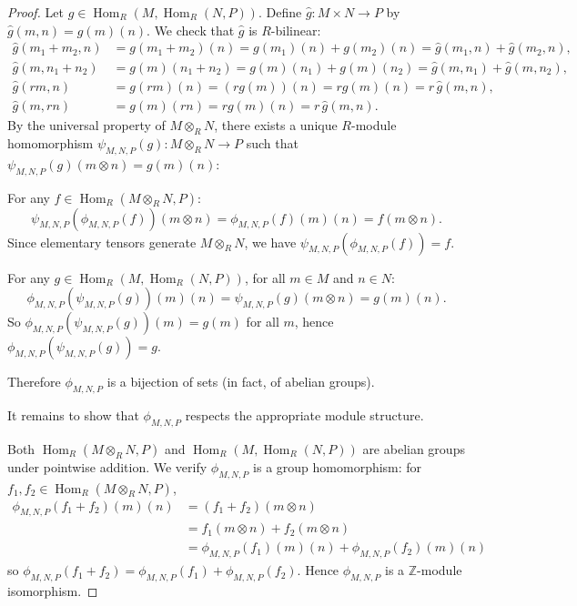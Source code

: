 \begin{proof}
    Let $g \in \operatorname{Hom}_R(M, \operatorname{Hom}_R(N, P))$. Define $\hat{g}: M \times N \to P$ by $\hat{g}(m,n) = g(m)(n)$. We check that $\hat{g}$ is $R$-bilinear:
    \begin{align*}
        \hat{g}(m_1+m_2,n) & = g(m_1+m_2)(n) = g(m_1)(n)+g(m_2)(n) = \hat{g}(m_1,n)+\hat{g}(m_2,n), \\
        \hat{g}(m,n_1+n_2) & = g(m)(n_1+n_2) = g(m)(n_1)+g(m)(n_2) = \hat{g}(m,n_1)+\hat{g}(m,n_2), \\
        \hat{g}(rm,n)      & = g(rm)(n) = (rg(m))(n) = rg(m)(n) = r\,\hat{g}(m,n),                  \\
        \hat{g}(m,rn)      & = g(m)(rn) = rg(m)(n) = r\,\hat{g}(m,n).
    \end{align*}
    By the universal property of $M \otimes_R N$, there exists a unique $R$-module homomorphism $\psi_{M,N,P}(g): M\otimes_R N \to P$ such that $\psi_{M,N,P}(g)(m\otimes n) = g(m)(n)$:
    \begin{center}
    \end{center}

    For any $f \in \operatorname{Hom}_R(M\otimes_R N,P)$:
    \[
        \psi_{M,N,P}(\phi_{M,N,P}(f))(m\otimes n) = \phi_{M,N,P}(f)(m)(n) = f(m\otimes n).
    \]
    Since elementary tensors generate $M\otimes_R N$, we have $\psi_{M,N,P}(\phi_{M,N,P}(f)) = f$.

    For any $g \in \operatorname{Hom}_R(M, \operatorname{Hom}_R(N,P))$, for all $m\in M$ and $n\in N$:
    \[
        \phi_{M,N,P}(\psi_{M,N,P}(g))(m)(n) = \psi_{M,N,P}(g)(m\otimes n) = g(m)(n).
    \]
    So $\phi_{M,N,P}(\psi_{M,N,P}(g))(m) = g(m)$ for all $m$, hence $\phi_{M,N,P}(\psi_{M,N,P}(g)) = g$.

    Therefore $\phi_{M,N,P}$ is a bijection of sets (in fact, of abelian groups).

    It remains to show that $\phi_{M,N,P}$ respects the appropriate module structure.

    Both $\operatorname{Hom}_R(M\otimes_R N, P)$ and $\operatorname{Hom}_R(M, \operatorname{Hom}_R(N,P))$ are abelian groups under pointwise addition. We verify $\phi_{M,N,P}$ is a group homomorphism: for $f_1, f_2 \in \operatorname{Hom}_R(M\otimes_R N, P)$,
    \begin{align*}
        \phi_{M,N,P}(f_1+f_2)(m)(n) & = (f_1+f_2)(m\otimes n)                           \\
                                    & = f_1(m\otimes n)+f_2(m\otimes n)                 \\
                                    & = \phi_{M,N,P}(f_1)(m)(n)+\phi_{M,N,P}(f_2)(m)(n)
    \end{align*}
    so $\phi_{M,N,P}(f_1+f_2)=\phi_{M,N,P}(f_1)+\phi_{M,N,P}(f_2)$. Hence $\phi_{M,N,P}$ is a $\mathbb{Z}$-module isomorphism.


\end{proof}
